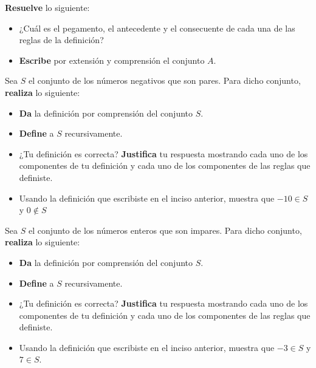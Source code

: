 \documentclass[oneside]{style}
\begin{document}
\begin{questions}[label=\protect\circled{\bfseries\arabic*}]
{        \textbf{Resuelve} lo siguiente:
        \begin{itemize}
            \item ¿Cuál es el pegamento, el antecedente y el consecuente de
            cada una de las reglas de la definición?

            \item \textbf{Escribe} por extensión y comprensión el conjunto $A$. 
        \end{itemize}
    }

    \question
    {
        Sea $S$ el conjunto de los números negativos que son pares. Para dicho 
        conjunto, \textbf{realiza} lo siguiente:
        \begin{itemize}
            \item \textbf{Da} la definición por comprensión del conjunto $S$.
            \item \textbf{Define} a $S$ recursivamente.
            \item ¿Tu definición es correcta? \textbf{Justifica} tu respuesta 
            mostrando cada uno de los componentes de tu definición y cada uno 
            de los componentes de las reglas que definiste. 
            \item Usando la definición que escribiste en el inciso anterior, 
            muestra que $-10 \in S$ y $0 \not \in S$ 
        \end{itemize}
    }

    \question
    {
        Sea $S$ el conjunto de los números enteros que son impares. Para 
        dicho conjunto, \textbf{realiza} lo siguiente:
        \begin{itemize}
            \item \textbf{Da} la definición por comprensión del conjunto $S$.
            \item \textbf{Define} a $S$ recursivamente.
            \item ¿Tu definición es correcta? \textbf{Justifica} tu respuesta 
            mostrando cada uno de los componentes de tu definición y cada uno 
            de los componentes de las reglas que definiste. 
            \item Usando la definición que escribiste en el inciso anterior, 
            muestra que $-3 \in S$ y $7 \in S$. 
        \end{itemize}
    }


\end{questions}
\end{document}
